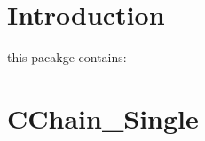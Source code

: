  \hypertarget{index_ToolSet}{}\section{Introduction}\label{index_ToolSet}
this pacakge contains: \hypertarget{index_CChain_Single}{}\section{CChain\_\-Single}\label{index_CChain_Single}
 